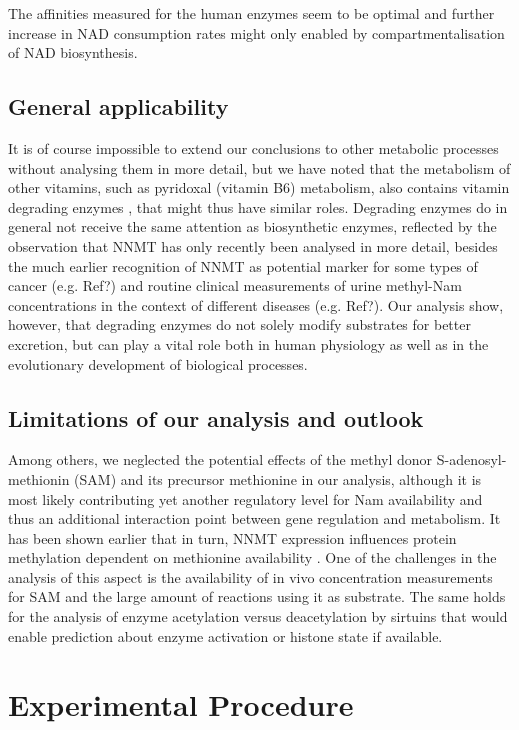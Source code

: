 \documentclass[paper=a4, 12pt]{scrartcl}
\begin{document}
The affinities measured for the human enzymes seem to be optimal and further increase in NAD consumption rates might only enabled by compartmentalisation of NAD biosynthesis.


\subsection{General applicability}

It is of course impossible to extend our conclusions to other metabolic processes without analysing them in more detail, but we have noted that the metabolism of other vitamins, such as pyridoxal (vitamin B6) metabolism, also contains vitamin degrading enzymes , that might thus have similar roles. Degrading enzymes do in general not receive the same attention as biosynthetic enzymes, reflected by the observation that NNMT has only recently been analysed in more detail, besides the much earlier recognition of NNMT as potential marker for some types of cancer (e.g. Ref?) and routine clinical measurements of urine methyl-Nam concentrations in the context of different diseases (e.g. Ref?). Our analysis show, however, that degrading enzymes do not solely modify substrates for better excretion, but can play a vital role both in human physiology as well as in the evolutionary development of biological processes.


\subsection{Limitations of our analysis and outlook}

Among others, we neglected the potential effects of the methyl donor S-adenosyl-methionin (SAM) and its precursor methionine in our analysis, although it is most likely contributing yet another regulatory level for Nam availability and thus an additional interaction point between gene regulation and metabolism. It has been shown earlier that in turn, NNMT expression influences protein methylation dependent on methionine availability \cite{Ulanovskaya2013}. One of the challenges in the analysis of this aspect is the availability of in vivo concentration measurements for SAM and the large amount of reactions using it as substrate. The same holds for the analysis of enzyme acetylation versus deacetylation by sirtuins that would enable prediction about enzyme activation or histone state if available.


\section{Experimental Procedure}
\end{document}
